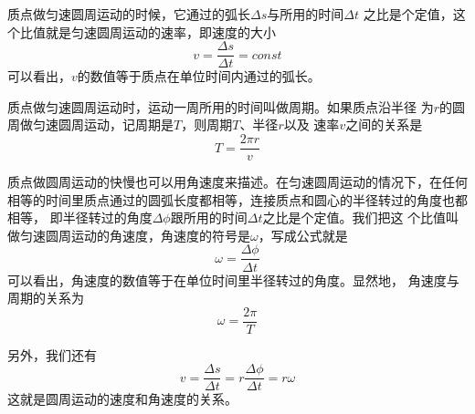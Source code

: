 质点做匀速圆周运动的时候，它通过的弧长$\Delta s$与所用的时间$\Delta t$
之比是个定值，这个比值就是匀速圆周运动的速率，即速度的大小
\begin{equation}
    v=\frac{\Delta s}{\Delta t}=const
\end{equation}
可以看出，$v$的数值等于质点在单位时间内通过的弧长。

质点做匀速圆周运动时，运动一周所用的时间叫做周期。如果质点沿半径
为$r$的圆周做匀速圆周运动，记周期是$T$，则周期$T$、半径$r$以及
速率$v$之间的关系是
\begin{equation}
    T=\frac{2\pi r}{v}
\end{equation}

质点做圆周运动的快慢也可以用角速度来描述。在匀速圆周运动的情况下，在任何
相等的时间里质点通过的圆弧长度都相等，连接质点和圆心的半径转过的角度也都相等，
即半径转过的角度$\Delta \phi$跟所用的时间$\Delta t$之比是个定值。我们把这
个比值叫做匀速圆周运动的角速度，角速度的符号是$\omega$，写成公式就是
\begin{equation}
    \omega=\frac{\Delta \phi}{\Delta t}
\end{equation}
可以看出，角速度的数值等于在单位时间里半径转过的角度。显然地，
角速度与周期的关系为
\begin{equation}
    \omega =\frac{2\pi}{T}
\end{equation}

另外，我们还有 
\begin{equation}
    v=\frac{\Delta s}{\Delta t}=r\frac{\Delta \phi}{\Delta t}=r\omega
\end{equation}
这就是圆周运动的速度和角速度的关系。

